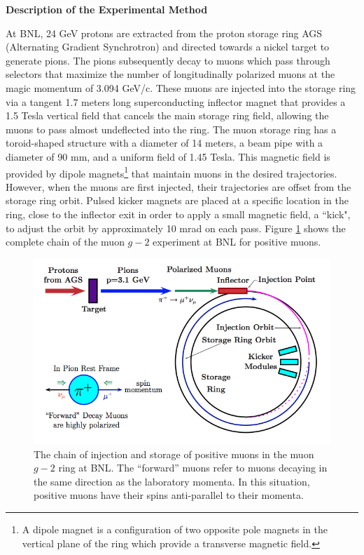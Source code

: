 \documentclass{outhesis}
\begin{document}
\textbf{Description of the Experimental Method}

At BNL, 24 GeV protons are extracted from the proton storage ring AGS (Alternating Gradient Synchrotron) and directed towards a nickel target to generate pions. The pions subsequently decay to muons which pass through selectors that maximize the number of longitudinally polarized muons at the magic momentum of 3.094 GeV/c. These muons are injected into the storage ring via a tangent 1.7 meters long superconducting inflector magnet that provides a 1.5 Tesla vertical field that cancels the main storage ring field, allowing the muons to pass almost undeflected into the ring. The muon storage ring has a toroid-shaped structure with a diameter of 14 meters, a beam pipe with a diameter of 90 mm, and a uniform field of 1.45 Tesla. This magnetic field is provided by dipole magnets\footnote{A dipole magnet is a configuration of two opposite pole magnets in the vertical plane of the ring which provide a transverse magnetic field.} that maintain muons in the desired trajectories. However, when the muons are first injected, their trajectories are offset from the storage ring orbit. Pulsed kicker magnets are placed at a specific location in the ring, close to the inflector exit in order to apply a small magnetic field, a ``kick", to adjust the orbit by approximately 10 mrad on each pass. Figure \ref{fig:chain} shows the complete chain of the muon $g-2$ experiment at BNL for positive muons.
 \begin{figure}
    \centering
  \includegraphics[scale=0.39]{figures/chain}
   \caption{The chain of injection and storage of positive muons in the muon $g-2$ ring at BNL. The ``forward'' muons refer to muons decaying in the same direction as the laboratory momenta. In this situation, positive muons have their spins anti-parallel to their momenta. \cite{phen}}
  \label{fig:chain}
\end{figure}
\end{document}
